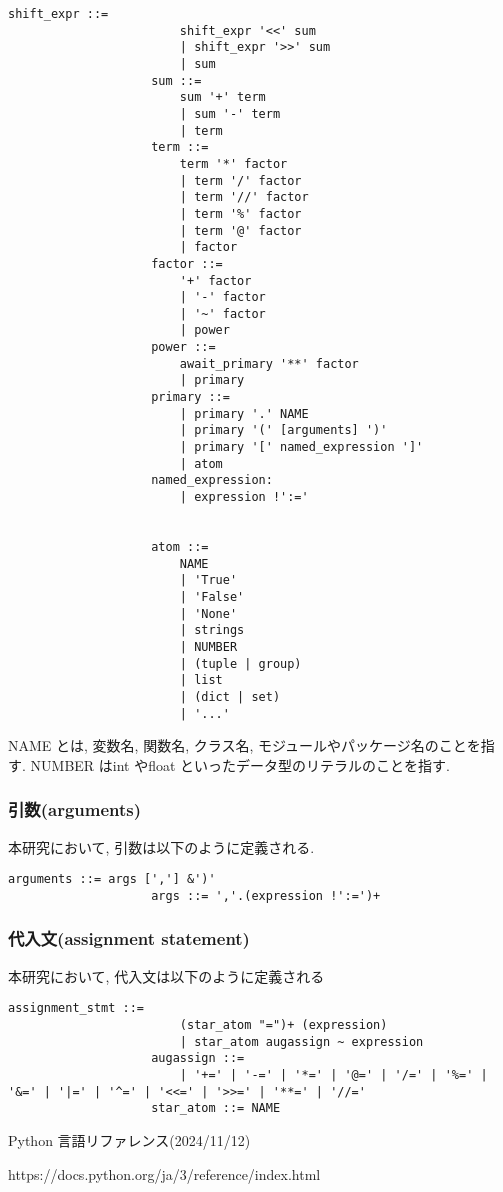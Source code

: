 \documentclass{jlreq}
\begin{document}
\begin{lstlisting}[caption=式の定義]
                    shift_expr ::=
                        shift_expr '<<' sum 
                        | shift_expr '>>' sum 
                        | sum
                    sum ::=
                        sum '+' term 
                        | sum '-' term 
                        | term
                    term ::=
                        term '*' factor 
                        | term '/' factor 
                        | term '//' factor 
                        | term '%' factor 
                        | term '@' factor 
                        | factor
                    factor ::=
                        '+' factor 
                        | '-' factor 
                        | '~' factor 
                        | power
                    power ::=
                        await_primary '**' factor 
                        | primary
                    primary ::=
                        | primary '.' NAME 
                        | primary '(' [arguments] ')' 
                        | primary '[' named_expression ']' 
                        | atom
                    named_expression:
                        | expression !':='


                    atom ::=
                        NAME
                        | 'True' 
                        | 'False' 
                        | 'None' 
                        | strings
                        | NUMBER
                        | (tuple | group)
                        | list
                        | (dict | set)
                        | '...'
                \end{lstlisting}
                NAME とは, 変数名, 関数名, クラス名, モジュールやパッケージ名のことを指す. NUMBER はint やfloat といったデータ型のリテラルのことを指す.
            \subsubsection{引数(arguments)}
                本研究において, 引数は以下のように定義される.
                \begin{lstlisting}[caption=代入文の定義,label=fuga]
                    arguments ::= args [','] &')'
                    args ::= ','.(expression !':=')+
                \end{lstlisting}
            \subsubsection{代入文(assignment statement)}
                本研究において, 代入文は以下のように定義される
                \begin{lstlisting}[caption=代入文の定義,label=fuga]
                    assignment_stmt ::=  
                        (star_atom "=")+ (expression)
                        | star_atom augassign ~ expression
                    augassign ::=
                        | '+=' | '-=' | '*=' | '@=' | '/=' | '%=' | '&=' | '|=' | '^=' | '<<=' | '>>=' | '**=' | '//='
                    star_atom ::= NAME
                \end{lstlisting}
                                
    \begin{thebibliography}{temp}
    Python 言語リファレンス(2024/11/12)
    
    https://docs.python.org/ja/3/reference/index.html
    \end{thebibliography}
\end{document}

